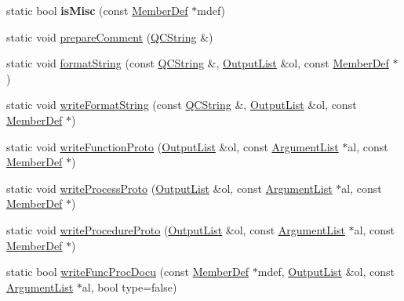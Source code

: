 \begin{DoxyCompactItemize}
\item 
\mbox{\label{class_vhdl_doc_gen_a55ef68e914c38033a48b6fdac2907689}} 
static bool {\bfseries is\+Misc} (const \mbox{\hyperlink{class_member_def}{Member\+Def}} $\ast$mdef)
\item 
static void \mbox{\hyperlink{class_vhdl_doc_gen_a802a7b8116fa1b8b46895c25a32c5677}{prepare\+Comment}} (\mbox{\hyperlink{class_q_c_string}{Q\+C\+String}} \&)
\item 
static void \mbox{\hyperlink{class_vhdl_doc_gen_aacccadab8f7d60dc0e4b2892ea724c2b}{format\+String}} (const \mbox{\hyperlink{class_q_c_string}{Q\+C\+String}} \&, \mbox{\hyperlink{class_output_list}{Output\+List}} \&ol, const \mbox{\hyperlink{class_member_def}{Member\+Def}} $\ast$)
\item 
static void \mbox{\hyperlink{class_vhdl_doc_gen_a0b58904c2803fe64c007b6c3ddda086e}{write\+Format\+String}} (const \mbox{\hyperlink{class_q_c_string}{Q\+C\+String}} \&, \mbox{\hyperlink{class_output_list}{Output\+List}} \&ol, const \mbox{\hyperlink{class_member_def}{Member\+Def}} $\ast$)
\item 
static void \mbox{\hyperlink{class_vhdl_doc_gen_ab1d66321a2c118a9376b65aeb598a49c}{write\+Function\+Proto}} (\mbox{\hyperlink{class_output_list}{Output\+List}} \&ol, const \mbox{\hyperlink{class_argument_list}{Argument\+List}} $\ast$al, const \mbox{\hyperlink{class_member_def}{Member\+Def}} $\ast$)
\item 
static void \mbox{\hyperlink{class_vhdl_doc_gen_a94ad80db8536156393a701496506c052}{write\+Process\+Proto}} (\mbox{\hyperlink{class_output_list}{Output\+List}} \&ol, const \mbox{\hyperlink{class_argument_list}{Argument\+List}} $\ast$al, const \mbox{\hyperlink{class_member_def}{Member\+Def}} $\ast$)
\item 
static void \mbox{\hyperlink{class_vhdl_doc_gen_a94da80078b9bba291b1c1af056eca6a4}{write\+Procedure\+Proto}} (\mbox{\hyperlink{class_output_list}{Output\+List}} \&ol, const \mbox{\hyperlink{class_argument_list}{Argument\+List}} $\ast$al, const \mbox{\hyperlink{class_member_def}{Member\+Def}} $\ast$)
\item 
static bool \mbox{\hyperlink{class_vhdl_doc_gen_a8c40c856602e19b4fe421c9572d618b7}{write\+Func\+Proc\+Docu}} (const \mbox{\hyperlink{class_member_def}{Member\+Def}} $\ast$mdef, \mbox{\hyperlink{class_output_list}{Output\+List}} \&ol, const \mbox{\hyperlink{class_argument_list}{Argument\+List}} $\ast$al, bool type=false)
\item 

\end{DoxyCompactItemize}
